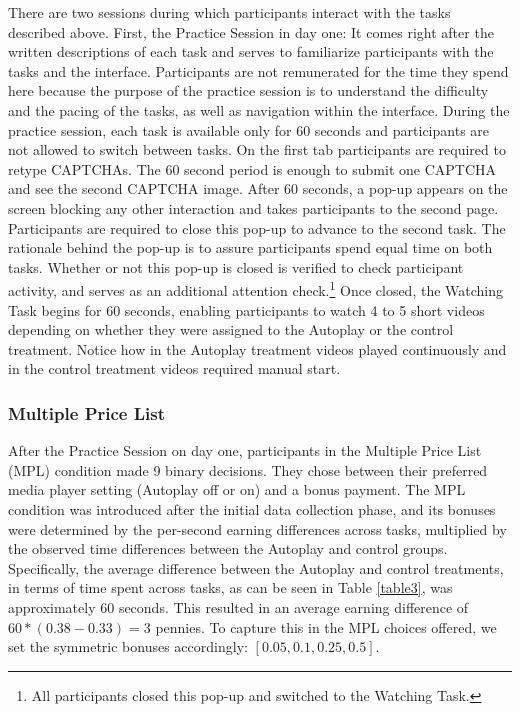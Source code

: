 \documentclass[11pt,a4paper,oneside]{article}
\begin{document}
There are two sessions during which participants interact with the tasks described above. First, the Practice Session in day one: It comes right after the written descriptions of each task and serves to familiarize participants with the tasks and the interface. Participants are not remunerated for the time they spend here because the purpose of the practice session is to understand the difficulty and the pacing of the tasks, as well as navigation within the interface. During the practice session, each task is available only for 60 seconds and participants are not allowed to switch between tasks. On the first tab participants are required to retype CAPTCHAs. The 60 second period is enough to submit one CAPTCHA and see the second CAPTCHA image. After 60 seconds, a pop-up appears on the screen blocking any other interaction and takes participants to the second page. Participants are required to close this pop-up to advance to the second task. The rationale behind the pop-up is to assure participants spend equal time on both tasks. Whether or not this pop-up is closed is verified to check participant activity, and serves as an additional attention check.\footnote{All participants closed this pop-up and switched to the Watching Task.} Once closed, the Watching Task begins for 60 seconds, enabling participants to watch 4 to 5 short videos depending on whether they were assigned to the Autoplay or the control treatment. Notice how in the Autoplay treatment videos played continuously and in the control treatment videos required manual start.

\subsubsection{Multiple Price List}\label{mpl}

After the Practice Session on day one, participants in the Multiple Price List (MPL) condition made 9 binary decisions. They chose between their preferred media player setting (Autoplay off or on) and a bonus payment. The MPL condition was introduced after the initial data collection phase, and its bonuses were determined by the per-second earning differences across tasks, multiplied by the observed time differences between the Autoplay and control groups. Specifically, the average difference between the Autoplay and control treatments, in terms of time spent across tasks, as can be seen in Table \ref{table3}, was approximately 60 seconds. This resulted in an average earning difference of $60*(0.38-0.33)=3$ pennies. To capture this in the MPL choices offered, we set the symmetric bonuses accordingly: \textsterling $[0.05, 0.1, 0.25, 0.5]$.
\end{document}

